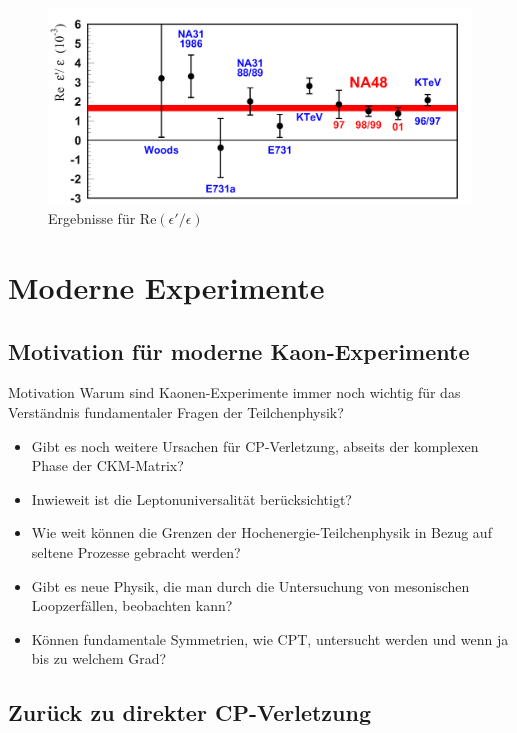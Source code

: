 \documentclass[aspectratio=1610, professionalfonts, 9pt, t]{beamer}
\begin{document}
  \begin{frame}
    \begin{figure}[ht]
      \includegraphics[height=0.8\textheight]{Images/REEE.png}
      \caption{Ergebnisse für Re$(\epsilon' / \epsilon) $}
    \end{figure}
  \end{frame}

  \section{Moderne Experimente}

  \subsection{Motivation für moderne Kaon-Experimente}

  \begin{frame}{Motivation}
    Warum sind Kaonen-Experimente immer noch wichtig für das Verständnis fundamentaler Fragen der Teilchenphysik?
    \begin{itemize}
      \item Gibt es noch weitere Ursachen für CP-Verletzung, abseits der komplexen Phase der CKM-Matrix?
      \item Inwieweit ist die Leptonuniversalität berücksichtigt?
      \item Wie weit können die Grenzen der Hochenergie-Teilchenphysik in Bezug auf seltene Prozesse gebracht werden?
      \item Gibt es neue Physik, die man durch die Untersuchung von mesonischen Loopzerfällen, beobachten kann?
      \item Können fundamentale Symmetrien, wie CPT, untersucht werden und wenn ja bis zu welchem Grad?
    \end{itemize}
  \end{frame}

  \subsection{Zurück zu direkter CP-Verletzung}
\end{document}
